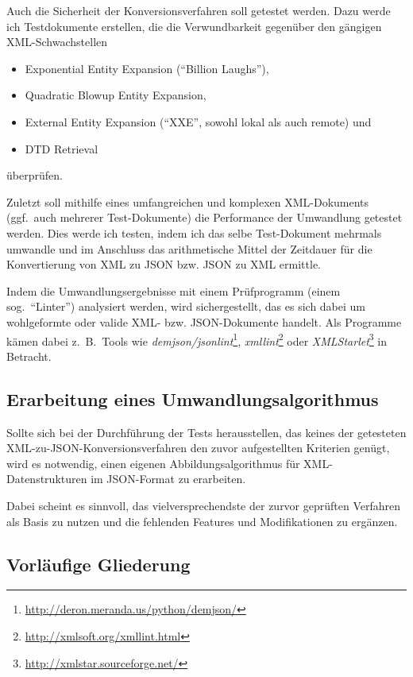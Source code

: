 \documentclass[conference]{template/IEEEtran}
\begin{document}
Auch die Sicherheit der Konversionsverfahren soll getestet werden. Dazu werde
ich Testdokumente erstellen, die die Verwundbarkeit gegenüber den gängigen
XML-Schwachstellen
\begin{itemize}
\item Exponential Entity Expansion (\enquote{Billion Laughs}),
\item Quadratic Blowup Entity Expansion,
\item External Entity Expansion (\enquote{XXE}, sowohl lokal als auch remote) und
\item DTD Retrieval
\end{itemize}
überprüfen.

Zuletzt soll mithilfe eines umfangreichen und komplexen XML-Dokuments
(ggf.~auch mehrerer Test-Dokumente) die Performance der Umwandlung getestet
werden. Dies werde ich testen, indem ich das selbe Test-Dokument mehrmals
umwandle und im Anschluss das arithmetische Mittel der Zeitdauer für die
Konvertierung von XML zu JSON bzw. JSON zu XML ermittle.

Indem die Umwandlungsergebnisse mit einem Prüfprogramm
(einem sog.\ \enquote{Linter}) analysiert werden, wird sichergestellt, das es
sich dabei um wohlgeformte oder valide XML- bzw. JSON-Dokumente handelt. Als
Programme kämen dabei z.~B.\ Tools wie
\emph{demjson/jsonlint}\footnote{\url{http://deron.meranda.us/python/demjson/}},
\emph{xmllint}\footnote{\url{http://xmlsoft.org/xmllint.html}} oder
\emph{XMLStarlet}\footnote{\url{http://xmlstar.sourceforge.net/}} in Betracht.

\subsection{Erarbeitung eines Umwandlungsalgorithmus}
\label{subsec:development}

Sollte sich bei der Durchführung der Tests herausstellen, das keines der
getesteten XML-zu-JSON-Konversionsverfahren den zuvor aufgestellten Kriterien
genügt, wird es notwendig, einen eigenen Abbildungsalgorithmus für
XML-Datenstrukturen im JSON-Format zu erarbeiten.

Dabei scheint es sinnvoll, das vielversprechendste der zurvor geprüften
Verfahren als Basis zu nutzen und die fehlenden Features und Modifikationen
zu ergänzen.

\subsection{Vorläufige Gliederung}
\label{subsec:structure}
\end{document}
